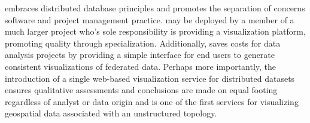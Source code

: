 \sciwms{} embraces distributed database principles and promotes the
separation of concerns software and project management
practice. \sciwms{} may be deployed by a member of a much larger
project who's sole responsibility is providing a visualization
platform, promoting quality through specialization. Additionally,
\sciwms{} saves costs for data analysis projects by providing a simple
interface for end users to generate consistent visualizations of
federated data. Perhaps more importantly, the introduction of a single
web-based visualization service for distributed datasets ensures
qualitative assessments and conclusions are made on equal footing
regardless of analyst or data origin and is one of the first services
for visualizing geospatial data associated with an unstructured
topology.
